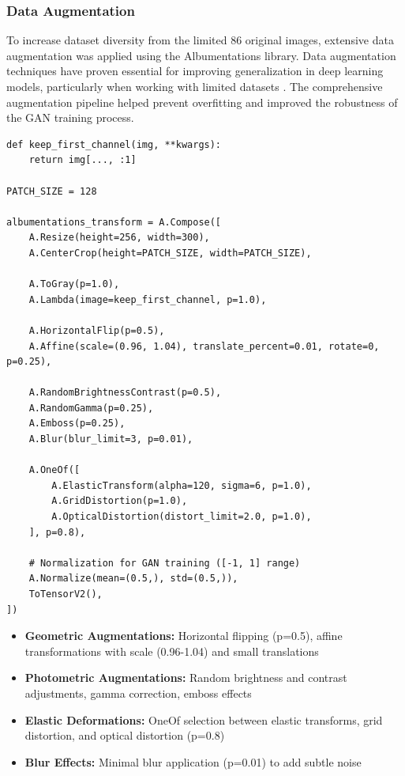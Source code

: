 \documentclass[a4paper, journal]{IEEEtran}
\begin{document}
\subsubsection{Data Augmentation}
To increase dataset diversity from the limited 86 original images, extensive data augmentation was applied using the Albumentations library. Data augmentation techniques have proven essential for improving generalization in deep learning models, particularly when working with limited datasets \cite{krizhevsky2012imagenet}. The comprehensive augmentation pipeline helped prevent overfitting and improved the robustness of the GAN training process.

\begin{lstlisting}[caption=Comprehensive Data Augmentation Pipeline]
def keep_first_channel(img, **kwargs):
    return img[..., :1]

PATCH_SIZE = 128 

albumentations_transform = A.Compose([
    A.Resize(height=256, width=300), 
    A.CenterCrop(height=PATCH_SIZE, width=PATCH_SIZE),  
    
    A.ToGray(p=1.0),  
    A.Lambda(image=keep_first_channel, p=1.0), 
    
    A.HorizontalFlip(p=0.5),  
    A.Affine(scale=(0.96, 1.04), translate_percent=0.01, rotate=0, p=0.25),
    
    A.RandomBrightnessContrast(p=0.5), 
    A.RandomGamma(p=0.25), 
    A.Emboss(p=0.25),  
    A.Blur(blur_limit=3, p=0.01), 
    
    A.OneOf([
        A.ElasticTransform(alpha=120, sigma=6, p=1.0),
        A.GridDistortion(p=1.0),
        A.OpticalDistortion(distort_limit=2.0, p=1.0),
    ], p=0.8),
    
    # Normalization for GAN training ([-1, 1] range)
    A.Normalize(mean=(0.5,), std=(0.5,)),
    ToTensorV2(), 
])
\end{lstlisting}

\begin{itemize}
    \item \textbf{Geometric Augmentations:} Horizontal flipping (p=0.5), affine transformations with scale (0.96-1.04) and small translations
    \item \textbf{Photometric Augmentations:} Random brightness and contrast adjustments, gamma correction, emboss effects
    \item \textbf{Elastic Deformations:} OneOf selection between elastic transforms, grid distortion, and optical distortion (p=0.8)
    \item \textbf{Blur Effects:} Minimal blur application (p=0.01) to add subtle noise
\end{itemize}
\end{document}
